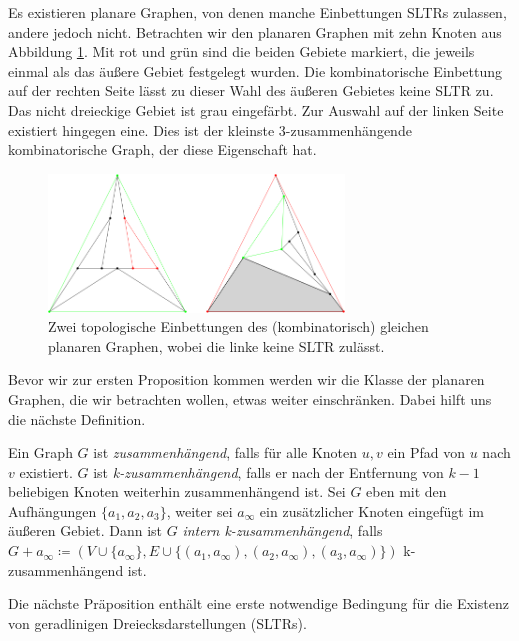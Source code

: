 \begin{example}\label{bsp1}
Es existieren planare Graphen, von denen manche Einbettungen SLTRs zulassen, andere jedoch nicht. Betrachten wir den planaren Graphen mit zehn Knoten aus Abbildung \ref{10_example}. Mit rot und grün sind die beiden Gebiete markiert, die jeweils einmal als das äußere Gebiet festgelegt wurden. Die kombinatorische Einbettung auf der rechten Seite lässt zu dieser Wahl des äußeren Gebietes keine SLTR zu. Das nicht dreieckige Gebiet ist grau eingefärbt. Zur Auswahl auf der linken Seite existiert hingegen eine. Dies ist der kleinste 3-zusammenhängende kombinatorische Graph, der diese Eigenschaft hat.

\begin{figure}[h]
\centering
\includegraphics[width=0.7\textwidth]{10_example.png}
\caption{Zwei topologische Einbettungen des (kombinatorisch) gleichen planaren Graphen, wobei die linke keine SLTR zulässt.}
\label{10_example}
\end{figure}

\end{example}

Bevor wir zur ersten Proposition kommen werden wir die Klasse der planaren Graphen, die wir betrachten wollen, etwas weiter einschränken. Dabei hilft uns die nächste Definition.

\begin{definition}\label{int_3_con}
Ein Graph $G$ ist \textit{zusammenhängend}, falls für alle Knoten $u,v$ ein Pfad von $u$ nach $v$ existiert. $G$ ist \textit{k-zusammenhängend}, falls er nach der Entfernung von $k-1$ beliebigen Knoten weiterhin zusammenhängend ist. Sei $G$ eben mit den Aufhängungen $\{a_1,a_2,a_3\}$, weiter sei $a_\infty$ ein zusätzlicher Knoten eingefügt im äußeren Gebiet. Dann ist $G$ \textit{intern k-zusammenhängend}, falls $G+a_\infty\coloneqq(V\cup\{a_\infty \},E\cup \{(a_1,a_\infty),(a_2,a_\infty),(a_3,a_\infty)\})$ k-zusammenhängend ist.
\end{definition}

Die nächste Präposition enthält eine erste notwendige Bedingung für die Existenz von geradlinigen Dreiecksdarstellungen (SLTRs).

